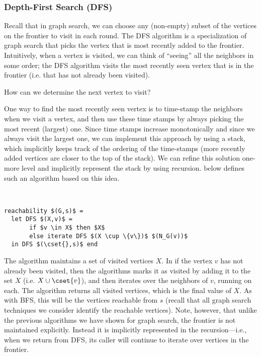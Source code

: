 \subsubsection{Depth-First Search (DFS)}

Recall that in graph search, we can choose any (non-empty) subset of
the vertices on the frontier to visit in each round. 
%
The DFS algorithm is a specialization of graph search that picks the
vertex that is most recently added to the frontier.  
%
Intuitively, when a vertex is visited, we can think of ``seeing'' all
the neighbors in some order; the DFS algorithm visits the most
recently seen vertex that is in the frontier (i.e. that has not
already been visited).

\begin{question}
  How can we determine the next vertex to visit?
\end{question}
%
One way to find the most recently seen vertex is to time-stamp the
neighbors when we visit a vertex, and then use these time stamps by
always picking the most recent (largest) one.
%
Since time stamps increase monotonically and since we always visit the
largest one, we can implement this approach by using a stack, which
implicitly keeps track of the ordering of the time-stamps (more recently added vertices are
closer to the top of the stack).
%
We can refine this solution one-more level and implicitly represent
the stack by using recursion.  
%
 below defines such an algorithm
based on this idea.
 
\begin{algorithm}~
\label{alg:dfs::reachability}
\begin{lstlisting}
reachability $(G,s)$ = 
  let DFS $(X,v)$ =       
       if $v \in X$ then $X$   
       else iterate DFS $(X \cup \{v\})$ $(N_G(v))$ 
  in DFS $(\cset{},s)$ end
\end{lstlisting}
\end{algorithm}

The algorithm maintains a set of visited vertices $X$.  In  if the vertex
$v$ has not already been visited, then the algorithms marks it as
visited by adding it to the set $X$ (i.e. $X \cup \cset{v}$), and then
iterates over the neighbors of $v$, running \dfs{} on
each.  
%
The algorithm returns all visited vertices, which is the final value
of $X$. 
As with BFS, this will be the vertices reachable from $s$ (recall that
all graph search techniques we consider identify the reachable vertices).
%
Note, however, that unlike the previous algorithms we have shown
for graph search, the frontier is not maintained explicitly.
Instead
it is implicitly represented in the recursion---i.e., when we return
from DFS, its caller will continue to iterate over vertices in the frontier.


